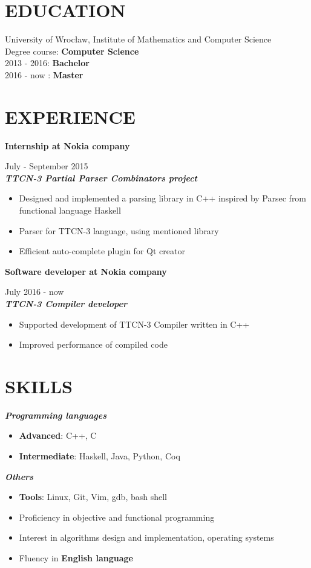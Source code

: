 \documentclass[line,overlapped]{res}
\newcommand{\textbt}[1]{\textit{\textbf{#1}}}
\begin{document}
\address{ Wrocław, przemek.lesniak1@gmail.com }
 
\begin{resume} 
\section{EDUCATION}

University of Wrocław, 
Institute of Mathematics and Computer Science \\ 
Degree course: \textbf{Computer Science} \\ 
2013 - 2016: \textbf{Bachelor}  \\
2016 - now : \textbf{Master} \\
\section{EXPERIENCE}
\textbf{Internship at Nokia company} \raggedright July - September 2015 \\
\textbt{TTCN-3 Partial Parser Combinators project} 
\begin{itemize}
	\item{Designed and implemented a parsing library in C++ inspired by Parsec from functional language Haskell }
	\item{Parser for TTCN-3 language, using mentioned library }
	\item{Efficient auto-complete plugin for Qt creator } 
\end{itemize}
\textbf{Software developer at Nokia company} \raggedright July 2016 - now \\
\textbt{TTCN-3 Compiler developer}
\begin{itemize}
	\item{Supported development of TTCN-3 Compiler written in C++}
	\item{Improved performance of compiled code}
\end{itemize}
\section{SKILLS}

\textbt{Programming languages}
\begin{itemize}
	\item{\textbf{Advanced}: C++, C}
	\item{\textbf{Intermediate}: Haskell, Java, Python, Coq }
\end{itemize}
\textbt{Others}
\begin{itemize}
	\item{\textbf{Tools}: Linux, Git, Vim, gdb, bash shell }
	\item{Proficiency in objective and functional programming }
	\item{Interest in algorithms design and implementation, operating systems}
	\item{Fluency in \textbf{English language} }
\end{itemize}


\end{resume}
\end{document}
